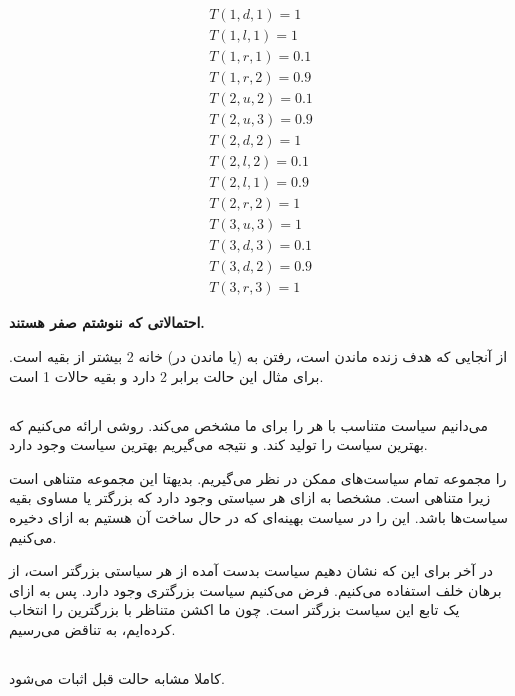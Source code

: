 \documentclass{university}
\begin{document}
\begin{gather*}
    T(1, d, 1) = 1 \\
    T(1, l, 1) = 1 \\
    T(1, r, 1) = 0.1 \\
    T(1, r, 2) = 0.9 \\
    T(2, u, 2) = 0.1 \\
    T(2, u, 3) = 0.9 \\
    T(2, d, 2) = 1 \\
    T(2, l, 2) = 0.1 \\
    T(2, l, 1) = 0.9 \\
    T(2, r, 2) = 1 \\
    T(3, u, 3) = 1 \\
    T(3, d, 3) = 0.1 \\
    T(3, d, 2) = 0.9 \\
    T(3, r, 3) = 1
\end{gather*}

\textbf{احتمالاتی که ننوشتم صفر هستند. }

از آنجایی که هدف زنده ماندن است،  
رفتن به (یا ماندن در) خانه 2 بیشتر از بقیه است. برای مثال این حالت 
برابر 2 دارد و 
بقیه حالات 1 است. 

\subsection{}

می‌دانیم سیاست
متناسب با هر 
را برای ما مشخص می‌کند. روشی ارائه می‌کنیم که بهترین سیاست را تولید کند. و نتیجه می‌گیریم بهترین سیاست وجود دارد.
 
\lr{$\Pi$} 
را مجموعه تمام سیاست‌های ممکن در نظر می‌گیریم. بدیهتا این مجموعه متناهی است زیرا 
متناهی است. مشخصا به ازای هر 
سیاستی وجود دارد که 
بزرگتر یا مساوی بقیه سیاست‌ها باشد. این 
را در سیاست بهینه‌ای که در حال ساخت آن هستیم به ازای 
دخیره می‌کنیم. 

در آخر برای این که نشان دهیم سیاست بدست آمده از هر سیاستی بزرگتر است، از برهان خلف استفاده می‌کنیم. فرض می‌کنیم سیاست بزرگتری وجود دارد. 
پس به ازای یک 
تابع 
این سیاست بزرگتر است. چون ما اکشن متناظر با بزرگترین 
را انتخاب کرده‌ایم، به تناقض می‌رسیم. 

\subsection{}

کاملا مشابه حالت قبل اثبات می‌شود.
\end{document}
